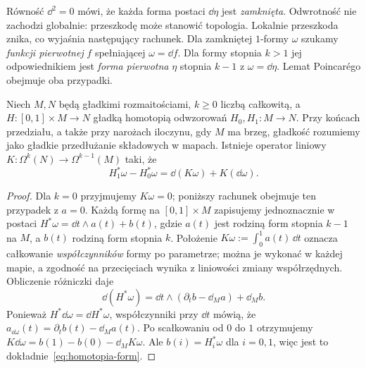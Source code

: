 Równość $\dd^2=0$ mówi, że każda forma postaci
$\dd\eta$ jest \emph{zamknięta}. Odwrotność nie zachodzi
globalnie: przeszkodę może stanowić topologia. Lokalnie
przeszkoda znika, co wyjaśnia następujący rachunek.
Dla zamkniętej $1$-formy $\omega$ szukamy \emph{funkcji
pierwotnej} $f$ spełniającej $\omega=\dd f$.
Dla formy stopnia $k>1$ jej odpowiednikiem jest
\emph{forma pierwotna} $\eta$ stopnia $k-1$ z
$\omega=\dd\eta$. Lemat Poincarégo obejmuje
oba przypadki.

\begin{lemat}
\label{lem:homotopia-form}
Niech $M,N$ będą gładkimi rozmaitościami,
$k\geq0$ liczbą całkowitą, a
$H:[0,1]\times M\to N$ gładką homotopią
odwzorowań $H_0,H_1:M\to N$. Przy końcach przedziału, a także
przy narożach iloczynu, gdy $M$ ma brzeg, gładkość
rozumiemy jako gładkie przedłużanie składowych w mapach. Istnieje operator liniowy
$K:\Omega^k(N)\to\Omega^{k-1}(M)$ taki, że
\begin{equation}\label{eq:homotopia-form}
 H_1^*\omega-H_0^*\omega
 =\dd(K\omega)+K(\dd\omega).
\end{equation}
\end{lemat}
\begin{proof}
Dla $k=0$ przyjmujemy $K\omega=0$; poniższy rachunek
obejmuje ten przypadek z $a=0$. Każdą formę na
$[0,1]\times M$ zapisujemy jednoznacznie
w postaci $H^*\omega=\dd t\wedge a(t)+b(t)$,
gdzie $a(t)$ jest rodziną form stopnia $k-1$ na $M$,
a $b(t)$ rodziną form stopnia $k$. Położenie
$K\omega:=\int_0^1 a(t)\,\dd t$ oznacza całkowanie
\emph{współczynników} formy po parametrze; można je
wykonać w każdej mapie, a zgodność na przecięciach
wynika z liniowości zmiany współrzędnych.
Obliczenie różniczki daje
\[
 \dd(H^*\omega)
 =\dd t\wedge(\partial_tb-\dd_Ma)+\dd_Mb.
\]
Ponieważ $H^*\dd\omega=\dd H^*\omega$, współczynniki
przy $\dd t$ mówią, że
$a_{\dd\omega}(t)=\partial_tb(t)-\dd_Ma(t)$.
Po scałkowaniu od $0$ do $1$ otrzymujemy
$K\dd\omega=b(1)-b(0)-\dd_MK\omega$.
Ale $b(i)=H_i^*\omega$ dla $i=0,1$,
więc jest to dokładnie~\eqref{eq:homotopia-form}.
\end{proof}

